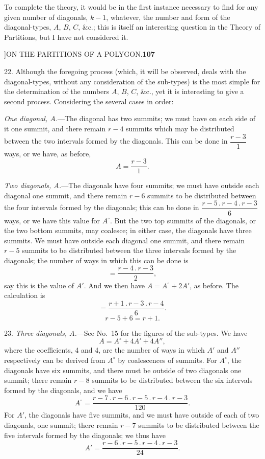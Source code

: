 \documentclass[11pt]{article}
\begin{document}
\hspace{1em} To complete the theory, it would be in the first instance
necessary to find for any given number of diagonals, $k-1$, whatever, the
number and form of the diagonal-types, $A$, $B$, $C$, \&c.; this is itself
an interesting question in the Theory of Partitions, but I have not
considered it.

\newpage
{}]\hfill ON THE PARTITIONS OF A POLYGON.\hfill\textbf{107}

\smallskip
\hspace{1em} 22. Although the foregoing process (which, it will be observed,
deals with the diagonal-types, without any consideration of the sub-types) is
the most simple for the determination of the numbers $A$, $B$, $C$, \&c., yet
it is interesting to give a second process. Considering the several cases in
order:

\hspace{1em} \emph{One diagonal, $A$.}---The diagonal has two summits; we
must have on each side of it one summit, and there remain $r-4$ summits
which may be distributed between the two intervals formed by the diagonals.
This can be done in $\dfrac{r-3}{1}$ ways, or we have, as before,
\[
A=\frac{r-3}{1}.
\]

\hspace{1em} \emph{Two diagonals, $A$.}---The diagonals have four summits;
we must have outside each diagonal one summit, and there remain $r-6$
summits to be distributed between the four intervals formed by the
diagonals; this can be done in $\dfrac{r-5\,.\,r-4\,.\,r-3}{6}$ ways,
or we have this value for $A^{\circ}$. But the two top summits of the
diagonals, or the two bottom summits, may coalesce; in either case, the
diagonals have three summits. We must have outside each diagonal one summit,
and there remain $r-5$ summits to be distributed between the three intervals
formed by the diagonals; the number of ways in which this can be done is
\[
=\frac{r-4\,.\,r-3}{2},
\]
say this is the value of $A'$. And we then have $A=A^{\circ}+2A'$,
as before. The calculation is
\[
=\frac{r+1\,.\,r-3\,.\,r-4}{6}.
\]
\[
r-5+6=r+1.
\]

\hspace{1em} 23. \emph{Three diagonals, $A$.}---See No.~15 for the figures of
the sub-types. We have
\[
A=A^{\circ}+4A'+4A'',
\]
where the coefficients, 4 and 4, are the number of ways in which $A'$ and
$A''$ respectively can be derived from $A^{\circ}$ by coalescences of
summits. For $A^{\circ}$, the diagonals have six summits, and there must be
outside of two diagonals one summit; there remain $r-8$ summits to be
distributed between the six intervals formed by the diagonals, and we have
\[
A^{\circ}=\frac{r-7\,.\,r-6\,.\,r-5\,.\,r-4\,.\,r-3}{120}.
\]
For $A'$, the diagonals have five summits, and we must have outside of each
of two diagonals, one summit; there remain $r-7$ summits to be distributed
between the five intervals formed by the diagonals; we thus have
\[
A'=\frac{r-6\,.\,r-5\,.\,r-4\,.\,r-3}{24}.
\]
\end{document}
